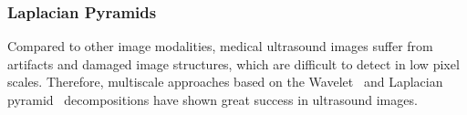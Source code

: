 
\subsubsection{Laplacian Pyramids}\label{section:pyramid}
%
Compared to other image modalities, medical ultrasound images suffer from artifacts and damaged image structures, which are difficult to detect in low pixel scales.
Therefore, multiscale approaches based on the Wavelet~\cite{xulizong_speckle_1998, xiaohuihao_novel_1999, pizurica_versatile_2003, yongyue_nonlinear_2006} and Laplacian pyramid~\cite{sattar_image_1997, zhang_multiscale_2006, zhang_nonlinear_2007, kang_new_2016} decompositions have shown great success in ultrasound images.

